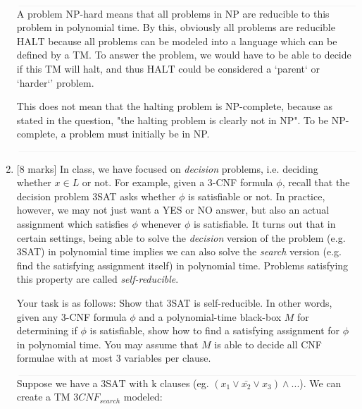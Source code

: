 \documentclass{article}
\newcommand{\class}[1]{\text{#1}}
\begin{document}
\begin{enumerate}
            $\textcolor[RGB]{220,220,220}{\rule{\linewidth}{0.2pt}}$
            A problem NP-hard means that all problems in NP are reducible to this problem in polynomial time. By this, obviously all problems are reducible $\class{HALT}$ because all problems can be modeled into a language which can be defined by a TM. To answer the problem, we would have to be able to decide if this TM will halt, and thus $\class{HALT}$ could be considered a `parent` or `harder`' problem.

            This does not mean that the halting problem is NP-complete, because as stated in the question, "the halting problem is clearly not in NP". To be NP-complete, a problem must initially be in NP.

            $\textcolor[RGB]{220,220,220}{\rule{\linewidth}{0.2pt}}$

    \item {[8 marks]} In class, we have focused on \emph{decision} problems, i.e. deciding whether $x\in L$ or not. For example, given a 3-CNF formula $\phi$, recall that the decision problem 3SAT asks whether $\phi$ is satisfiable or not. In practice, however, we may not just want a YES or NO answer, but also an actual assignment which satisfies $\phi$ whenever $\phi$ is satisfiable. It turns out that in certain settings, being able to solve the \emph{decision} version of the problem (e.g. 3SAT) in polynomial time implies we can also solve the \emph{search} version (e.g. find the satisfying assignment itself) in polynomial time. Problems satisfying this property are called \emph{self-reducible}.

Your task is as follows: Show that 3SAT is self-reducible. In other words, given any 3-CNF formula $\phi$ and a polynomial-time black-box $M$ for determining if $\phi$ is satisfiable, show how to find a satisfying assignment for $\phi$ in polynomial time. You may assume that $M$ is able to decide all CNF formulae with {at most} 3 variables per clause.

            $\textcolor[RGB]{220,220,220}{\rule{\linewidth}{0.2pt}}$
            Suppose we have a $\class{3SAT}$ with k clauses (eg. $(x_1 \vee \bar{x_2} \vee x_3) \wedge . . .$). We can create a TM $3CNF_{search}$ modeled:



\end{enumerate}
\end{document}
